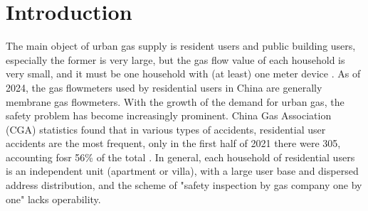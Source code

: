 \documentclass[10pt, sigconf]{acmart}
\begin{document}




\maketitle

\section{Introduction}

The main object of urban gas supply is resident users and public building users, especially the former is very large, but the gas flow value of each household is very small, and it must be one household with (at least) one meter device \cite{fraiwan2011wireless, omidvarborna2021low}. As of 2024, the gas flowmeters used by residential users in China are generally membrane gas flowmeters.  With the growth of the demand for urban gas, the safety problem has become increasingly prominent. China Gas Association (CGA) statistics found that in various types of accidents, residential user accidents are the most frequent, only in the first half of 2021 there were 305, accounting fosr 56\% of the total \cite{zhang2023building}. In general, each household of residential users is an independent unit (apartment or villa), with a large user base and dispersed address distribution, and the scheme of "safety inspection by gas company one by one" lacks operability. 
\end{document}
